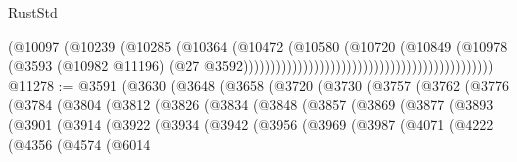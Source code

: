 \begin{lexlean}{RustStd}
\begin{coremodule}
                                                                          (@10097
                                                                            (@10239
                                                                              (@10285
                                                                                (@10364
                                                                                  (@10472
                                                                                    (@10580
                                                                                      (@10720
                                                                                        (@10849
                                                                                          (@10978
                                                                                            (@3593
                                                                                              (@10982
                                                                                                @11196)
                                                                                              (@27
                                                                                                @3592))))))))))))))))))))))))))))))))))))))))))))))
@11278 := @3591
    (@3630
      (@3648
        (@3658
          (@3720
            (@3730
              (@3757
                (@3762
                  (@3776
                    (@3784
                      (@3804
                        (@3812
                          (@3826
                            (@3834
                              (@3848
                                (@3857
                                  (@3869
                                    (@3877
                                      (@3893
                                        (@3901
                                          (@3914
                                            (@3922
                                              (@3934
                                                (@3942
                                                  (@3956
                                                    (@3969
                                                      (@3987
                                                        (@4071
                                                          (@4222
                                                            (@4356
                                                              (@4574
                                                                (@6014

\end{coremodule}
\end{lexlean}
